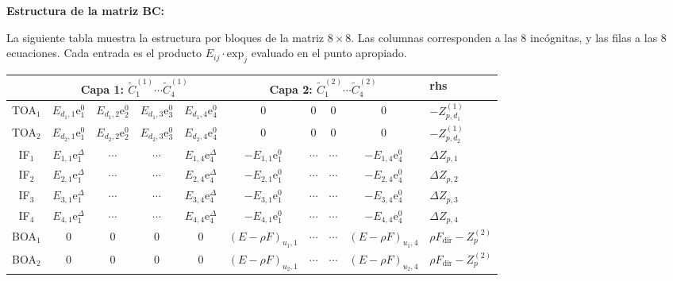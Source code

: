 \documentclass[a4paper,11pt]{article}
\begin{document}
\textbf{Estructura de la matriz $\mathbf{BC}$:}

La siguiente tabla muestra la estructura por bloques de la matriz $8 \times 8$.  Las columnas corresponden a las 8 inc\'ognitas, y las filas a las 8 ecuaciones.  Cada entrada es el producto $E_{ij} \cdot \text{exp}_j$ evaluado en el punto apropiado.

\begin{center}
\renewcommand{\arraystretch}{1.2}
\footnotesize
\begin{tabular}{c|cccc|cccc|l}
& \multicolumn{4}{c|}{Capa 1: $\widetilde{C}_1^{(1)} \cdots \widetilde{C}_4^{(1)}$}
& \multicolumn{4}{c|}{Capa 2: $\widetilde{C}_1^{(2)} \cdots \widetilde{C}_4^{(2)}$}
& rhs \\
\hline
TOA$_1$ & $E_{d_1,1}\text{e}_1^0$ & $E_{d_1,2}\text{e}_2^0$ & $E_{d_1,3}\text{e}_3^0$ & $E_{d_1,4}\text{e}_4^0$ & 0 & 0 & 0 & 0 & $-Z_{p,d_1}^{(1)}$ \\
TOA$_2$ & $E_{d_2,1}\text{e}_1^0$ & $E_{d_2,2}\text{e}_2^0$ & $E_{d_2,3}\text{e}_3^0$ & $E_{d_2,4}\text{e}_4^0$ & 0 & 0 & 0 & 0 & $-Z_{p,d_2}^{(1)}$ \\
\hline
IF$_1$ & $E_{1,1}\text{e}_1^\Delta$ & $\cdots$ & $\cdots$ & $E_{1,4}\text{e}_4^\Delta$ & $-E_{1,1}\text{e}_1^0$ & $\cdots$ & $\cdots$ & $-E_{1,4}\text{e}_4^0$ & $\Delta Z_{p,1}$ \\
IF$_2$ & $E_{2,1}\text{e}_1^\Delta$ & $\cdots$ & $\cdots$ & $E_{2,4}\text{e}_4^\Delta$ & $-E_{2,1}\text{e}_1^0$ & $\cdots$ & $\cdots$ & $-E_{2,4}\text{e}_4^0$ & $\Delta Z_{p,2}$ \\
IF$_3$ & $E_{3,1}\text{e}_1^\Delta$ & $\cdots$ & $\cdots$ & $E_{3,4}\text{e}_4^\Delta$ & $-E_{3,1}\text{e}_1^0$ & $\cdots$ & $\cdots$ & $-E_{3,4}\text{e}_4^0$ & $\Delta Z_{p,3}$ \\
IF$_4$ & $E_{4,1}\text{e}_1^\Delta$ & $\cdots$ & $\cdots$ & $E_{4,4}\text{e}_4^\Delta$ & $-E_{4,1}\text{e}_1^0$ & $\cdots$ & $\cdots$ & $-E_{4,4}\text{e}_4^0$ & $\Delta Z_{p,4}$ \\
\hline
BOA$_1$ & 0 & 0 & 0 & 0 & $(E-\rho F)_{u_1,1}$ & $\cdots$ & $\cdots$ & $(E-\rho F)_{u_1,4}$ & $\rho F_{\text{dir}} - Z_p^{(2)}$ \\
BOA$_2$ & 0 & 0 & 0 & 0 & $(E-\rho F)_{u_2,1}$ & $\cdots$ & $\cdots$ & $(E-\rho F)_{u_2,4}$ & $\rho F_{\text{dir}} - Z_p^{(2)}$ \\
\end{tabular}
\end{center}
\end{document}
